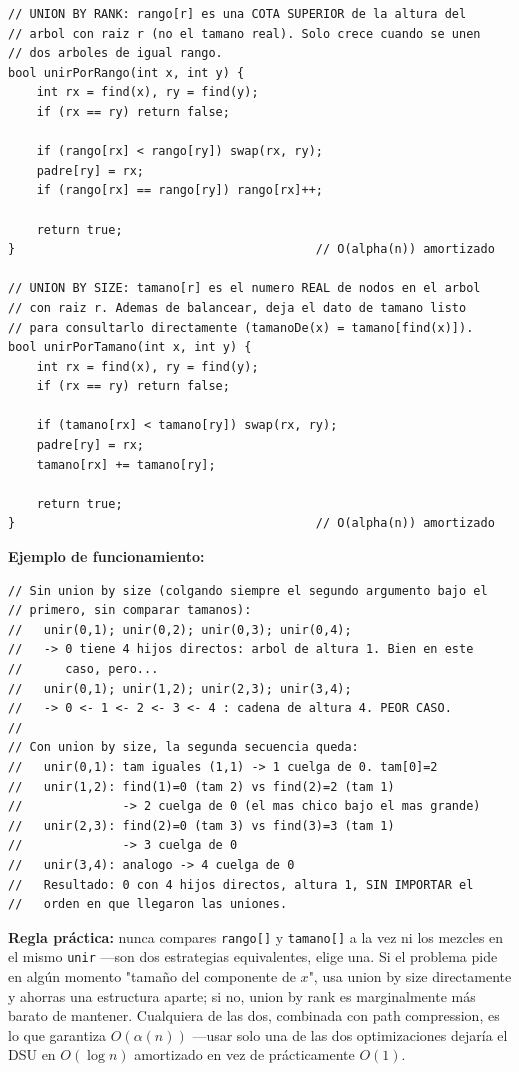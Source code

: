 \documentclass[10pt,a4paper,twocolumn]{article}
\begin{document}
\begin{lstlisting}[style=cpp]
// UNION BY RANK: rango[r] es una COTA SUPERIOR de la altura del
// arbol con raiz r (no el tamano real). Solo crece cuando se unen
// dos arboles de igual rango.
bool unirPorRango(int x, int y) {
    int rx = find(x), ry = find(y);
    if (rx == ry) return false;

    if (rango[rx] < rango[ry]) swap(rx, ry);
    padre[ry] = rx;
    if (rango[rx] == rango[ry]) rango[rx]++;

    return true;
}                                          // O(alpha(n)) amortizado

// UNION BY SIZE: tamano[r] es el numero REAL de nodos en el arbol
// con raiz r. Ademas de balancear, deja el dato de tamano listo
// para consultarlo directamente (tamanoDe(x) = tamano[find(x)]).
bool unirPorTamano(int x, int y) {
    int rx = find(x), ry = find(y);
    if (rx == ry) return false;

    if (tamano[rx] < tamano[ry]) swap(rx, ry);
    padre[ry] = rx;
    tamano[rx] += tamano[ry];

    return true;
}                                          // O(alpha(n)) amortizado
\end{lstlisting}

\textbf{Ejemplo de funcionamiento:}

\begin{lstlisting}[style=cpp]
// Sin union by size (colgando siempre el segundo argumento bajo el
// primero, sin comparar tamanos):
//   unir(0,1); unir(0,2); unir(0,3); unir(0,4);
//   -> 0 tiene 4 hijos directos: arbol de altura 1. Bien en este
//      caso, pero...
//   unir(0,1); unir(1,2); unir(2,3); unir(3,4);
//   -> 0 <- 1 <- 2 <- 3 <- 4 : cadena de altura 4. PEOR CASO.
//
// Con union by size, la segunda secuencia queda:
//   unir(0,1): tam iguales (1,1) -> 1 cuelga de 0. tam[0]=2
//   unir(1,2): find(1)=0 (tam 2) vs find(2)=2 (tam 1)
//              -> 2 cuelga de 0 (el mas chico bajo el mas grande)
//   unir(2,3): find(2)=0 (tam 3) vs find(3)=3 (tam 1)
//              -> 3 cuelga de 0
//   unir(3,4): analogo -> 4 cuelga de 0
//   Resultado: 0 con 4 hijos directos, altura 1, SIN IMPORTAR el
//   orden en que llegaron las uniones.
\end{lstlisting}

\textbf{Regla práctica:} nunca compares \texttt{rango[]} y
\texttt{tamano[]} a la vez ni los mezcles en el mismo \texttt{unir}
—son dos estrategias equivalentes, elige una. Si el problema pide en
algún momento "tamaño del componente de $x$", usa union by size
directamente y ahorras una estructura aparte; si no, union by rank es
marginalmente más barato de mantener. Cualquiera de las dos,
combinada con path compression, es lo que garantiza $O(\alpha(n))$
—usar solo una de las dos optimizaciones dejaría el DSU en
$O(\log n)$ amortizado en vez de prácticamente $O(1)$.
\end{document}
